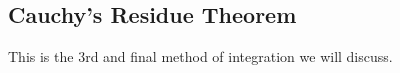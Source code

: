\subsection{Cauchy's Residue Theorem}\label{subsec:Cauchys_Residue_Theorem}
This is the 3rd and final method of integration we will discuss.



